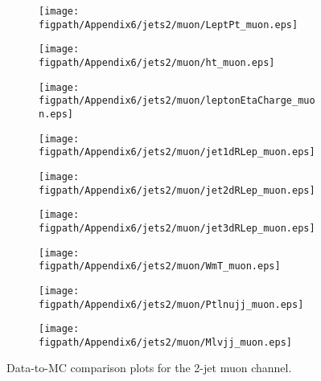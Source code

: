 \begin{figure}[!hbtp]
    \centering
    \begin{subfigure}[t]{0.317\textwidth}
        \texttt{[image: \\figpath/Appendix6/jets2/muon/LeptPt\_muon.eps]}
    \end{subfigure}
    \begin{subfigure}[t]{0.317\textwidth}
        \texttt{[image: \\figpath/Appendix6/jets2/muon/ht\_muon.eps]}
    \end{subfigure}
    \begin{subfigure}[t]{0.317\textwidth}
        \texttt{[image: \\figpath/Appendix6/jets2/muon/leptonEtaCharge\_muon.eps]}
    \end{subfigure}

    \begin{subfigure}[t]{0.317\textwidth}
        \texttt{[image: \\figpath/Appendix6/jets2/muon/jet1dRLep\_muon.eps]}
    \end{subfigure}
    \begin{subfigure}[t]{0.317\textwidth}
        \texttt{[image: \\figpath/Appendix6/jets2/muon/jet2dRLep\_muon.eps]}
    \end{subfigure}
    \begin{subfigure}[t]{0.317\textwidth}
        \texttt{[image: \\figpath/Appendix6/jets2/muon/jet3dRLep\_muon.eps]}
    \end{subfigure}

    \begin{subfigure}[t]{0.317\textwidth}
        \texttt{[image: \\figpath/Appendix6/jets2/muon/WmT\_muon.eps]}
    \end{subfigure}
    \begin{subfigure}[t]{0.317\textwidth}
        \texttt{[image: \\figpath/Appendix6/jets2/muon/Ptlnujj\_muon.eps]}
    \end{subfigure}
    \begin{subfigure}[t]{0.317\textwidth}
        \texttt{[image: \\figpath/Appendix6/jets2/muon/Mlvjj\_muon.eps]}
    \end{subfigure}
    \caption{Data-to-MC comparison plots for the 2-jet muon channel.}
    \label{fig:comparison_plots_jets2_muon_2}
\end{figure}
















